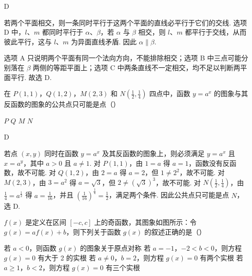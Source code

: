 \begin{answer}
D
\end{answer}

\begin{solution}
若两个平面相交，则一条同时平行于这两个平面的直线必平行于它们的交线. 选项 D 中，\(l\)、\(m\) 都同时平行于 \(\alpha\)、\(\beta\)，若 \(\alpha\) 与 \(\beta\) 相交，则 \(l\)、\(m\) 都平行于交线，从而彼此平行，这与 \(l\)、\(m\) 为异面直线矛盾. 因此 \(\alpha\parallel\beta\).

选项 A 只说明两个平面有同一个法向方向，不能排除相交；选项 B 中三点可能分别落在 \(\beta\) 两侧的等距平面上；选项 C 中两条直线不一定相交，均不足以判断两平面平行. 故选 D.
\end{solution}

\begin{problem}
在 \(P(1,1)\)，\(Q(1,2)\)，\(M(2,3)\) 和 \(N\left(\frac{1}{2},\frac{1}{4}\right)\) 四点中，函数 \(y = a^x\) 的图象与其反函数的图象的公共点只可能是点（\quad）

\choices
    {\(P\)}
    {\(Q\)}
    {\(M\)}
    {\(N\)}
\end{problem}

\begin{answer}
D
\end{answer}

\begin{solution}
若点 \((x,y)\) 同时在函数 \(y=a^x\) 及其反函数的图象上，则必须满足 \(y=a^x\) 且 \(x=a^y\)，其中 \(a>0\) 且 \(a\ne1\). 对 \(P(1,1)\)，由 \(1=a\) 得 \(a=1\)，函数没有反函数，故不可能. 对 \(Q(1,2)\)，由 \(2=a\) 得 \(a=2\)，但 \(1\ne2^2\)，故不可能. 对 \(M(2,3)\)，由 \(3=a^2\) 得 \(a=\sqrt{3}\)，但 \(2\ne(\sqrt{3})^3\)，故不可能. 对 \(N\left(\frac{1}{2},\frac{1}{4}\right)\)，由 \(\frac{1}{4}=a^{\frac{1}{2}}\) 得 \(a=\frac{1}{16}\)，并且 \(\left(\frac{1}{16}\right)^{\frac{1}{4}}=\frac{1}{2}\)，满足两个条件. 因此公共点只可能是点 \(N\)，选 D.
\end{solution}

\begin{problem}
\(f(x)\) 是定义在区间 \([-c, c]\) 上的奇函数，其图象如图所示：令 \(g(x) = af(x) + b\)，则下列关于函数 \(g(x)\) 的叙述正确的是（\quad）


\choices
    {若 \(a < 0\)，则函数 \(g(x)\) 的图象关于原点对称}
    {若 \(a = -1\)，\(-2 < b < 0\)，则方程 \(g(x) = 0\) 有大于 2 的实根}
    {若 \(a \neq 0\)，\(b = 2\)，则方程 \(g(x) = 0\) 有两个实根}
    {若 \(a \geqslant 1\)，\(b < 2\)，则方程 \(g(x) = 0\) 有三个实根}
\end{problem}

